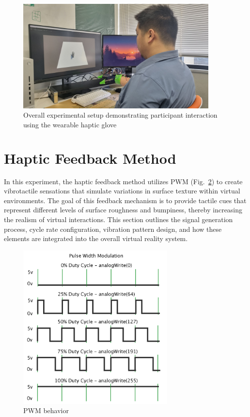 \begin{figure}[H]\centering
	\includegraphics[width=0.9\textwidth]{Pictures/experiment.png}%
	\caption{Overall experimental setup demonstrating participant interaction using the wearable haptic glove}\label{fig:experiment}%
	
\end{figure}

\newpage
\section{Haptic Feedback Method}

In this experiment, the haptic feedback method utilizes PWM (Fig.~\ref{fig:pwm_2}) to create vibrotactile sensations that simulate variations in surface texture within virtual environments. The goal of this feedback mechanism is to provide tactile cues that represent different levels of surface roughness and bumpiness, thereby increasing the realism of virtual interactions. This section outlines the signal generation process, cycle rate configuration, vibration pattern design, and how these elements are integrated into the overall virtual reality system.

\begin{figure}[H]\centering
	\includegraphics[width=0.7\textwidth]{Pictures/PWM_2.png}%
	\caption{PWM behavior~\cite{pwm_doc}}\label{fig:pwm_2}%
	
\end{figure}

